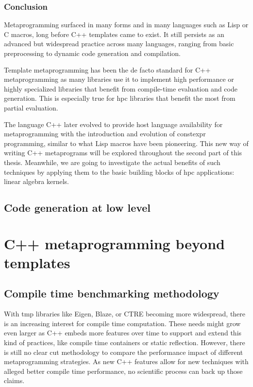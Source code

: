 \documentclass[english,12pt,a4paper]{book}
\providecommand{\cpp}{\textsc{C++}\xspace}
\begin{document}



\section{
  Conclusion
}

Metaprogramming surfaced in many forms and in many languages such as Lisp or C
macros, long before \cpp templates came to exist.
It still persists as an advanced but widespread practice across many languages,
ranging from basic preprocessing to dynamic code generation and compilation.

Template metaprogramming has been the de facto standard for \cpp metaprogramming
as many libraries use it to implement high performance or highly specialized
libraries that benefit from compile-time evaluation and code generation.
This is especially true for \gls{hpc} libraries that benefit the most from
partial evaluation.

The language \cpp later evolved to provide host language availability for
metaprogramming with the introduction and evolution of \gls{constexpr}
programming, similar to what Lisp macros have been pioneering.
This new way of writing \cpp metaprograms will be explored throughout
the second part of this thesis. Meanwhile, we are going to investigate the
actual benefits of such techniques by applying them to the basic building blocks
of \gls{hpc} applications: linear algebra kernels.

\chapter{
  Code generation at low level
}



\part{
  C++ metaprogramming beyond templates
}

\chapter{
  Compile time benchmarking methodology
}

With \gls{tmp} libraries like Eigen\cite{eigen}, Blaze\cite{blazelib},
or CTRE \cite{ctre} becoming more widespread,
there is an increasing interest for compile time computation.
These needs might grow
even larger as \cpp embeds more features over time to support and extend this
kind of practices, like compile time containers \cite{more-constexpr-containers}
or static reflection\cite{static-reflection}. However, there is still no clear
cut methodology to compare the performance impact of different metaprogramming
strategies.
As new \cpp features allow for new techniques with alleged
better compile time performance, no scientific process can back up those claims.
\end{document}
